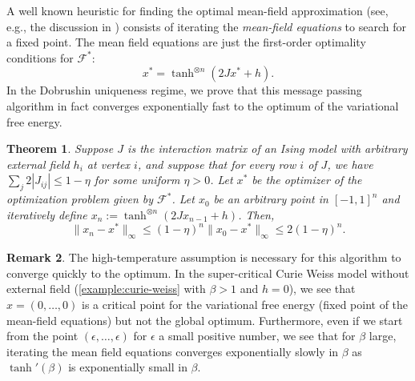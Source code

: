 \documentclass[final, 12pt]{colt2018}
\newcommand{\fnote}[1]{\textcolor{blue}{\small {\textbf{(Fred: }#1\textbf{) }}}}
\newtheorem{theorem}{Theorem}[section]
\theoremstyle{definition}
\newtheorem{remark}[theorem]{Remark}
\theoremstyle{plain}
\begin{document}
A well known heuristic for finding the optimal mean-field approximation (see, e.g., the discussion in \citet{wainwright-jordan-variational})
consists of iterating the \emph{mean-field equations} to search for a fixed point. The mean field equations are just the first-order optimality conditions for $\mathcal{F}^*$:
\begin{equation}\label{eqn:mean-field-equations}
x^* = \tanh^{\otimes n}(2Jx^* + h).
\end{equation}
In the Dobrushin uniqueness regime,
we prove that this message passing algorithm in fact converges exponentially fast to the optimum of the variational free energy.
\begin{theorem}\label{thm:message-passing}
Suppose $J$ is the interaction matrix of an Ising model with
arbitrary external field $h_i$ at vertex $i$, and suppose that
for every row $i$ of $J$, we have $\sum_{j} 2|J_{ij}| \le 1 - \eta$ 
for some uniform $\eta > 0$.
Let $x^*$ be the optimizer of the optimization problem given by $\mathcal{F}^*$.
Let $x_0$ be an arbitrary point in $[-1,1]^n$ and iteratively define $x_n := \tanh^{\otimes n}(2 J x_{n - 1} + h)$.
Then,
\[ \|x_n - x^*\|_{\infty} \le (1 - \eta)^n \|x_0 - x^*\|_{\infty} \le 2 (1 - \eta)^n. \]
\end{theorem}
\begin{remark}\label{rmk:exp-slow}
The high-temperature assumption is necessary for this algorithm to converge
quickly to the optimum. In the super-critical Curie Weiss model without external field (\cref{example:curie-weiss} with $\beta > 1$ and $h = 0$), we see that
$x = (0,\ldots,0)$ is a critical point for the variational free energy (fixed point of the mean-field equations) but not the global optimum. Furthermore,
even if we start from the point $(\epsilon, \ldots, \epsilon)$ for $\epsilon$ a small positive number, we see that for $\beta$ large, iterating the mean field equations converges exponentially slowly in $\beta$ as $\tanh'(\beta)$ is exponentially small in $\beta$. 
\iffalse %
Similarly, we see that near the optimum the gradients can be exponentially large in $\beta$, so for gradient descent with constant step sizes, we likely need to choose a step size which is exponentially small. \fnote{Check details?}
\fi
\end{remark}
\end{document}
